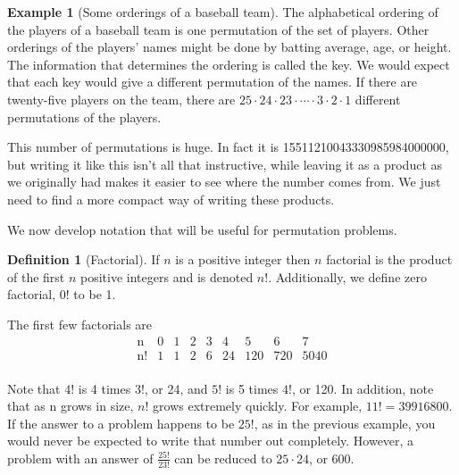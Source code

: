 \documentclass[10pt,]{book}
\theoremstyle{plain}
\theoremstyle{definition}
\newtheorem{definition}[theorem]{Definition}
\newtheorem{example}[theorem]{Example}
\begin{document}
%
\begin{example}[Some orderings of a baseball team]\label{some_orderings_of_a_baseball_team}
The alphabetical ordering of the players of a baseball team is one permutation of the set of players. Other orderings of the players' names might be done by batting average, age, or height. The information that determines the ordering is called the key. We would expect that each key would give a different permutation of the names. If there are twenty-five players on the team, there are \(25 \cdot 24 \cdot 23 \cdot \cdots  \cdot 3 \cdot 2 \cdot 1\) different permutations of the players.%
\par
This number of permutations is huge. In fact it is 15511210043330985984000000, but writing it like this isn't all that instructive, while leaving it as a product as we originally had makes it easier to see where the number comes from.  We just need to find a more compact way of writing these products.%
\end{example}
\par

 We now develop notation that will be useful for permutation problems.
%
\begin{definition}[Factorial]\label{Definition-Factorial.}
 If \(n\) is a positive integer then \(n\) factorial is the product of the first \(n\) positive integers and is denoted \(n!\). Additionally, we define zero factorial, \(0!\) to be 1.%
\end{definition}
\label{notation-8}
\par
The first few factorials are 
\[
\begin{array}{ccccccccc}
 \text{n} & 0 & 1 & 2 & 3 & 4 & 5 & 6 &
   7 \\
 \text{n!} & 1 & 1 & 2 & 6 & 24 & 120 &
   720 & 5040 \\
\end{array}
\]%
\par
Note that \(4!\) is 4 times \(3!\), or 24, and \(5!\) is 5 times \(4!\), or 120. In addition, note that as n grows in size, \(n!\) grows extremely quickly. For example, \(11! = 39916800\). If the answer to a problem happens to be \(25!\), as in the previous example, you would never be expected to write that number out completely. However, a problem with an answer of \(\frac{25!}{23!}\) can be reduced to \(25 \cdot 24\), or 600.%
\par
\end{document}
